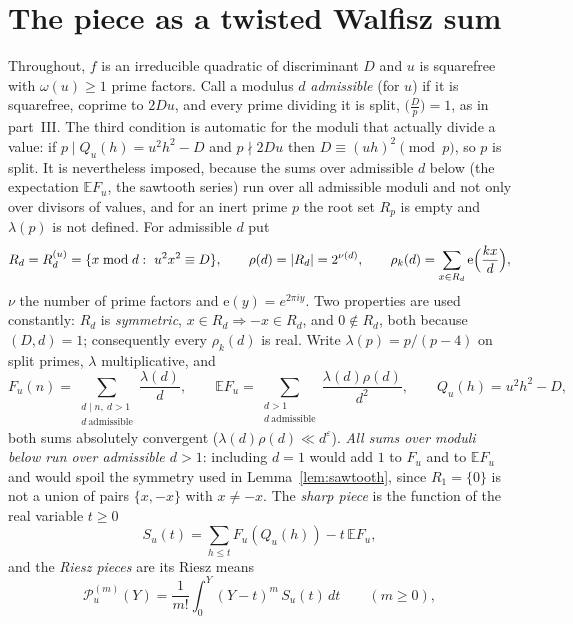 \documentclass[11pt,a4paper]{article}
\theoremstyle{remark}\newtheorem{remark}[theorem]{Remark}
\newcommand{\e}{\mathrm e}\newcommand{\Off}{\mathrm{Off}}\newcommand{\rep}[2]{\langle #1\rangle_{#2}}
\begin{document}
\section{The piece as a twisted Walfisz sum}\label{sec:walfisz}

Throughout, $f$ is an irreducible quadratic of discriminant $D$ and $u$ is squarefree with $\omega(u)\ge1$ prime
factors. Call a modulus $d$ \emph{admissible} (for $u$) if it is squarefree, coprime to $2Du$, and every prime
dividing it is split, $\bigl(\tfrac Dp\bigr)=1$, as in part~III. The third condition is automatic for the moduli that
actually divide a value: if $p\mid Q_u(h)=u^2h^2-D$ and $p\nmid2Du$ then $D\equiv(uh)^2\pmod p$, so $p$ is split.
It is nevertheless imposed, because the sums over admissible $d$ below (the expectation $\mathbb EF_u$, the sawtooth
series) run over all admissible moduli and not only over divisors of values, and for an inert prime $p$ the root set
$R_p$ is empty and $\lambda(p)$ is not defined. For admissible $d$ put
\[
R_d=R^{(u)}_d=\{x\bmod d:\ u^2x^2\equiv D\},\qquad \rho(d)=|R_d|=2^{\nu(d)},\qquad
\rho_k(d)=\sum_{x\in R_d}\e\Bigl(\frac{kx}d\Bigr),
\]
$\nu$ the number of prime factors and $\e(y)=e^{2\pi iy}$. Two properties are used constantly: $R_d$ is
\emph{symmetric}, $x\in R_d\Rightarrow-x\in R_d$, and $0\notin R_d$, both because $(D,d)=1$; consequently every
$\rho_k(d)$ is real. Write $\lambda(p)=p/(p-4)$ on split primes, $\lambda$ multiplicative, and
\begin{equation}\label{eq:FE}
F_u(n)=\sum_{\substack{d\mid n,\ d>1\\ d\ \mathrm{admissible}}}\frac{\lambda(d)}d,\qquad
\mathbb EF_u=\sum_{\substack{d>1\\ d\ \mathrm{admissible}}}\frac{\lambda(d)\rho(d)}{d^2},\qquad Q_u(h)=u^2h^2-D,
\end{equation}
both sums absolutely convergent ($\lambda(d)\rho(d)\ll d^{\varepsilon}$). \emph{All sums over moduli below run over
admissible $d>1$}: including $d=1$ would add $1$ to $F_u$ and to $\mathbb EF_u$ and would spoil the symmetry used in
Lemma~\ref{lem:sawtooth}, since $R_1=\{0\}$ is not a union of pairs $\{x,-x\}$ with $x\ne-x$. The \emph{sharp piece}
is the function of the real variable $t\ge0$
\begin{equation}\label{eq:Sm}
S_u(t)=\sum_{h\le t}F_u(Q_u(h))-t\,\mathbb EF_u ,
\end{equation}
and the \emph{Riesz pieces} are its Riesz means
\begin{equation}\label{eq:Pm}
\mathcal P^{(m)}_u(Y)=\frac1{m!}\int_0^Y(Y-t)^m\,S_u(t)\,dt\qquad(m\ge0),
\end{equation}
\end{document}
